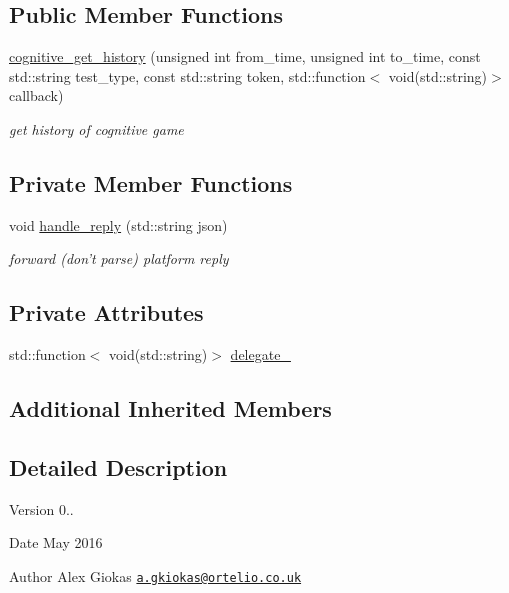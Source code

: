 \subsection*{Public Member Functions}
\begin{DoxyCompactItemize}
\item 
\hyperlink{classrapp_1_1cloud_1_1cognitive__get__history_a032761594f708a59624227d99d83d193}{cognitive\-\_\-get\-\_\-history} (unsigned int from\-\_\-time, unsigned int to\-\_\-time, const std\-::string test\-\_\-type, const std\-::string token, std\-::function$<$ void(std\-::string)$>$ callback)
\begin{DoxyCompactList}\small\item\em get history of cognitive game \end{DoxyCompactList}\end{DoxyCompactItemize}
\subsection*{Private Member Functions}
\begin{DoxyCompactItemize}
\item 
void \hyperlink{classrapp_1_1cloud_1_1cognitive__get__history_a9c815e07081ef62616f9ce913e27d190}{handle\-\_\-reply} (std\-::string json)
\begin{DoxyCompactList}\small\item\em forward (don't parse) platform reply \end{DoxyCompactList}\end{DoxyCompactItemize}
\subsection*{Private Attributes}
\begin{DoxyCompactItemize}
\item 
std\-::function$<$ void(std\-::string)$>$ \hyperlink{classrapp_1_1cloud_1_1cognitive__get__history_a0d81d8bd2a5a4e4ea3cd84582008bee7}{delegate\-\_\-}
\end{DoxyCompactItemize}
\subsection*{Additional Inherited Members}


\subsection{Detailed Description}
\begin{DoxyVersion}{Version}
0.. 
\end{DoxyVersion}
\begin{DoxyDate}{Date}
May 2016 
\end{DoxyDate}
\begin{DoxyAuthor}{Author}
Alex Giokas \href{mailto:a.gkiokas@ortelio.co.uk}{\tt a.\-gkiokas@ortelio.\-co.\-uk} 
\end{DoxyAuthor}


